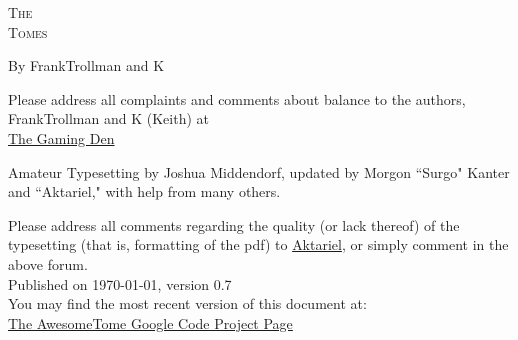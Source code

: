\pagestyle{plain}

\begin{center} \Huge

\textsc{The\\
Tomes\\
}\end{center}



\vspace{2cm}
\begin{center}\large By FrankTrollman and K\end{center}


\newpage

\vspace*{4in}

\noindent Please address all complaints and comments about balance to the authors, FrankTrollman and K (Keith) at\\
{\color{blue} \href{http://tgdmb.com/viewforum.php?f=1}{The Gaming Den}}

\vspace{0.2in}



\noindent Amateur Typesetting by Joshua Middendorf, updated by Morgon ``Surgo" Kanter and ``Aktariel," with help from many others.\\

\vspace{0.15in}

\noindent Please address all comments regarding the quality (or lack thereof) of the typesetting (that is, formatting of the pdf) to \href{mailto:aktariel@gmail.com}{Aktariel}, or simply comment in the above forum.\\





\vspace{1in}
\noindent Published on \today, version 0.7\\
\noindent You may find the most recent version of this document at:\\
{\color{blue} \href{http://code.google.com/p/awesometome/downloads/list}{The AwesomeTome Google Code Project Page}}

\newpage

